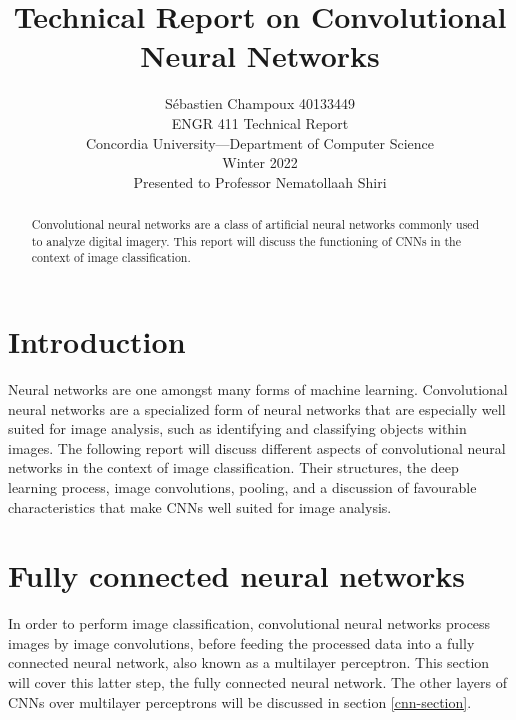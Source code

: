 ﻿\documentclass[12pt,a4paper,notitlepage]{article}
\begin{document}
\title{Technical Report on Convolutional Neural Networks}
\author{Sébastien Champoux 40133449
\\ ENGR 411 Technical Report
\\ Concordia University—Department of Computer Science
\\ Winter 2022
\\ Presented to Professor Nematollaah Shiri
}
\maketitle

\begin{abstract}
Convolutional neural networks are a class of artificial neural networks commonly used to analyze digital imagery. This report will discuss the functioning of CNNs in the context of image classification.
\end{abstract}

\clearpage
\tableofcontents

\clearpage
\listoffigures

\clearpage

\section{Introduction}
Neural networks are one amongst many forms of machine learning. Convolutional neural networks are a specialized form of neural networks that are especially well suited for image analysis, such as identifying and classifying objects within images. The following report will discuss different aspects of convolutional neural networks  in the context of image classification. Their structures, the deep learning process, image convolutions, pooling, and a discussion of favourable characteristics that make CNNs well suited for image analysis.

\section{Fully connected neural networks}\label{fully-connected-networks}
In order to perform image classification, convolutional neural networks process images by image convolutions, before feeding the processed data into a fully connected neural network, also known as a multilayer perceptron. This section will cover this latter step, the fully connected neural network. The other layers of CNNs over multilayer perceptrons will be discussed in section \ref{cnn-section}.
\end{document}
